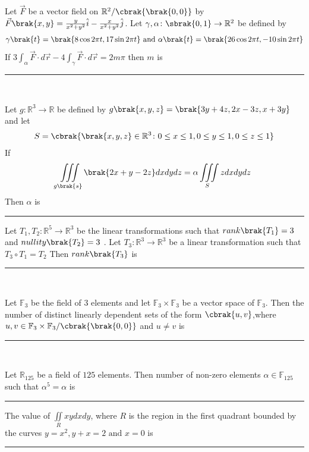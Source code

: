        \item Let $\vec{F}$ be a vector field on $\mathbb{R}^2 / \cbrak{\brak{0,0}}$ by $\vec{F}\brak{x,y} = \frac{y}{x^2 + y^2}\hat{i} - \frac{x}{x^2 + y^2}\hat{j}$. Let $\gamma , \alpha \colon \sbrak{0,1} \rightarrow \mathbb{R}^2$ be defined by 
       \begin{align}
           \gamma \brak{t} = \brak{8 \cos{2 \pi t} , 17\sin{2\pi t}} \text{ and } \alpha\brak{t} = \brak{26\cos{2\pi t}, -10\sin{2 \pi t}}
       \end{align}
       If $3\int_{\alpha}\vec{F}\cdot d\vec{r} - 4\int_{\gamma}\vec{F}\cdot d\vec{r} = 2m\pi$ then $m$  is \rule{3cm}{0.15mm}\\
       \item Let $g \colon \mathbb{R}^3 \rightarrow \mathbb{R}$ be defined by $g\brak{x,y,z} = \brak{3y + 4z , 2x - 3z , x+ 3y}$ and let\begin{align} S = \cbrak{\brak{x,y,z} \in \mathbb{R}^3 \colon 0 \leq x \leq 1 , 0 \leq y \leq 1 , 0 \leq z \leq 1} \end{align} If
       \begin{align}
           \iiint \limits_{g\brak{s}}\brak{2x+y-2z}dxdydz = \alpha \iiint\limits_S z dx dy dz
       \end{align}
       Then $\alpha$ is \rule{3cm}{0.15mm}
       \item Let $T_1,T_2 \colon \mathbb{R}^5 \rightarrow \mathbb{R}^3$ be the linear transformations such that $rank\brak{T_1} = 3$ and $nullity\brak{T_2} = 3$ . Let $T_3 \colon \mathbb{R}^3 \rightarrow \mathbb{R}^3$ be a linear transformation such that $T_3 \circ T_1 = T_2$ Then $rank\brak{T_3}$ is \rule{3cm}{0.15mm}\\
       \item Let $\mathbb{F}_3$ be the field of 3 elements and let $\mathbb{F}_3 \times \mathbb{F}_3$ be a vector space of $\mathbb{F}_3$. Then the number of distinct linearly dependent sets of the form $\cbrak{u,v}$,where $u,v \in \mathbb{F}_3 \times \mathbb{F}_3 / \cbrak{\brak{0,0}}$ and $ u \neq v$ is \rule{3cm}{0.15mm}\\
       \item Let $\mathbb{R}_{125}$ be a field of $125$ elements. Then number of non-zero elements $\alpha \in \mathbb{F}_{125}$ such that $\alpha^5 = \alpha$ is \rule{3cm}{0.15mm}
       \item The value of $\iint \limits_R x y dx dy$, where $R$ is the region in the first quadrant bounded  by the curves $y = x^2 , y+x=2 \text{ and } x =0$ is \rule{3cm}{0.15mm}\\
